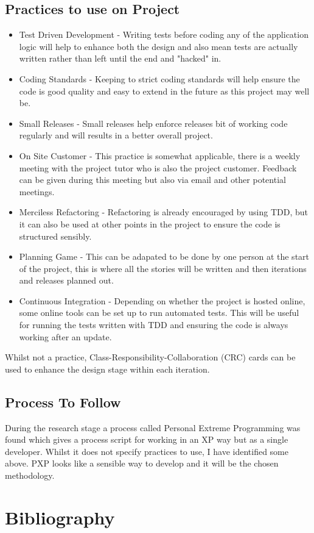 \documentclass{article}
\begin{document}
\subsection{Practices to use on Project}
\begin{itemize}
	\item Test Driven Development - Writing tests before coding any of the application logic will help to enhance both the design and also mean tests are actually written rather than left until the end and "hacked" in.
	\item Coding Standards - Keeping to strict coding standards will help ensure the code is good quality and easy to extend in the future as this project may well be.
	\item Small Releases - Small releases help enforce releases bit of working code regularly and will results in a better overall project.
	\item On Site Customer - This practice is somewhat applicable, there is a weekly meeting with the project tutor who is also the project customer. Feedback can be given during this meeting but also via email and other potential meetings.
	\item Merciless Refactoring - Refactoring is already encouraged by using TDD, but it can also be used at other points in the project to ensure the code is structured sensibly.
	\item Planning Game - This can be adapated to be done by one person at the start of the project, this is where all the stories will be written and then iterations and releases planned out.
	\item Continuous Integration - Depending on whether the project is hosted online, some online tools can be set up to run automated tests. This will be useful for running the tests written with TDD and ensuring the code is always working after an update.
\end{itemize}
Whilst not a practice, Class-Responsibility-Collaboration (CRC) cards can be used to enhance the design stage within each iteration.

\subsection{Process To Follow}
During the research stage a process called Personal Extreme Programming was found\cite{agarwal2008extreme} which gives a process script for working in an XP way but as a single developer. Whilst it does not specify practices to use, I have identified some above. PXP looks like a sensible way to develop and it will be the chosen methodology.
\newpage

\section{Bibliography}


%
\end{document}
